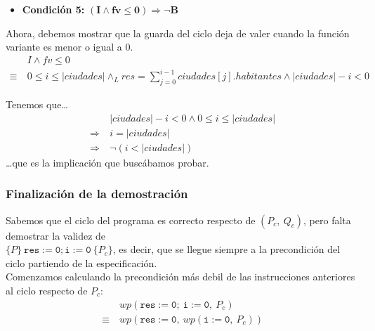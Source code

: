 \documentclass[10pt,a4paper]{article}
\begin{document}
\begin{itemize}
    \item{\textbf{Condición 5:} $\mathbf{(I \land fv \leq 0) \Rightarrow \lnot B}$}
\end{itemize}

Ahora, debemos mostrar que la guarda del ciclo deja de valer cuando la función variante es menor o igual a 0. \\
\begin{equation*}
    \begin{split}
    & I \land fv \leq 0 \\
    \equiv \ & 0 \leq i \leq |ciudades| \land_L res = \sum_{j = 0}^{i - 1} ciudades[j].habitantes \land |ciudades| - i < 0
    \end{split}
\end{equation*}

Tenemos que\ldots \\
\begin{equation*}
    \begin{split}
        & |ciudades| - i < 0 \land 0 \leq i \leq |ciudades| \\
        \Rightarrow \ & i = |ciudades| \\
        \Rightarrow \ & \lnot(i < |ciudades|)
    \end{split}
\end{equation*}
\ldots que es la implicación que buscábamos probar.



\subsubsection{Finalización de la demostración}
Sabemos que el ciclo del programa es correcto respecto de $(P_c, \ Q_c)$, pero falta demostrar la validez de \\
$\{P\} \ \mathtt{res := 0; i := 0} \ \{P_c\}$, es decir, que se llegue siempre a la precondición del ciclo partiendo de la especificación. \\

Comenzamos calculando la precondición más debil de las instrucciones anteriores al ciclo respecto de $P_c$:
\begin{equation*}
    \begin{split}
    & wp(\mathtt{res := 0; \ i := 0}, \ P_c) \\
    \equiv \ & wp(\mathtt{res := 0}, \ wp(\mathtt{i := 0}, \ P_c))
    \end{split}
\end{equation*}
\end{document}
